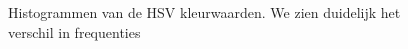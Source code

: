 \documentclass[a4paper,kulak]{kulakarticle}
\begin{document}
\begin{figure}[H]
	\centering
	\qquad
	\qquad
	
	\caption{Histogrammen van de HSV kleurwaarden. We zien duidelijk het verschil in frequenties}
	\label{figuur HSVHIST}
\end{figure}
\end{document}
